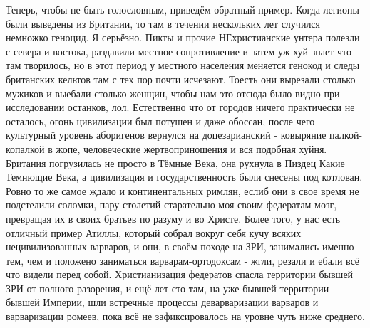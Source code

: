 Теперь, чтобы не быть голословным, приведём обратный пример. Когда легионы были выведены из Британии, то там в течении нескольких лет случился немножко геноцид. Я серьёзно. Пикты и прочие НЕхристианские унтера полезли с севера и востока, раздавили местное сопротивление и затем уж хуй знает что там творилось, но в этот период у местного населения меняется генокод и следы британских кельтов там с тех пор почти исчезают. Тоесть они вырезали столько мужиков и выебали столько женщин, чтобы нам это отсюда было видно при исследовании останков, лол. Естественно что от городов ничего практически не осталось, огонь цивилизации был потушен и даже обоссан, после чего культурный уровень аборигенов вернулся на доцезарианский - ковыряние палкой-копалкой в жопе, человеческие жертвоприношения и вся подобная хуйня. Британия погрузилась не просто в Тёмные Века, она рухнула в Пиздец Какие Темнющие Века, а цивилизация и государственность были снесены под котлован. Ровно то же самое ждало и континентальных римлян, еслиб они в свое время не подстелили соломки, пару столетий старательно моя своим федератам мозг, превращая их в своих братьев по разуму и во Христе. Более того, у нас есть отличный пример Атиллы, который собрал вокруг себя кучу всяких нецивилизованных варваров, и они, в своём походе на ЗРИ, занимались именно тем, чем и положено заниматься варварам-ортодоксам - жгли, резали и ебали всё что видели перед собой. Христианизация федератов спасла территории бывшей ЗРИ от полного разорения, и ещё лет сто там, на уже бывшей территории бывшей Империи, шли встречные процессы деварваризации варваров и варваризации ромеев, пока всё не зафиксировалось на уровне чуть ниже среднего.
